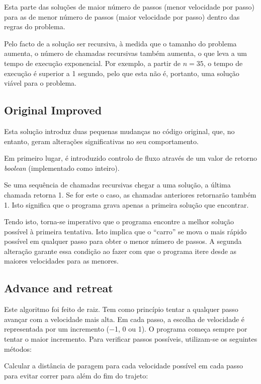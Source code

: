 \documentclass[portuguese,11pt,a4paper,titlepage]{article}
\newcommand{\extrang}[1]{\textit{#1}}
\newcommand{\srcdir}{..}
\begin{document}
Esta parte das soluções de maior número de passos (menor velocidade por passo) para
as de menor número de passos (maior velocidade por passo) dentro das regras do problema.

Pelo facto de a solução ser recursiva, à medida que o tamanho do problema aumenta,
o número de chamadas recursivas também aumenta, o que leva a um tempo de execução exponencial.
Por exemplo, a partir de \begin{math}n = 35\end{math}, o tempo de execução é superior a 1 segundo,
pelo que esta não é, portanto, uma solução viável para o problema. 

\subsection{Original Improved}
Esta solução introduz duas pequenas mudanças no código original, que, no entanto,
geram alterações significativas no seu comportamento.

Em primeiro lugar, é introduzido controlo de fluxo através de um valor de retorno
\extrang{boolean} (implementado como inteiro).

Se uma sequência de chamadas recursivas chegar a uma solução, a última chamada
retorna 1. 
Se for este o caso, as chamadas anteriores retornarão também 1.
Isto significa que o programa grava apenas a primeira solução que encontrar.

Tendo isto, torna-se imperativo que o programa encontre a melhor solução possível
à primeira tentativa. Isto implica que o ``carro'' se mova o mais rápido possível
em qualquer passo para obter o menor número de passos. A segunda alteração
garante essa condição ao fazer com que o programa itere
desde as maiores velocidades para as menores.


\subsection{Advance and retreat}
Este algoritmo foi feito de raiz. Tem como
princípio tentar a qualquer passo avançar com a velocidade mais alta.
Em cada passo, a escolha de velocidade é representada por um incremento
($-$1, 0 ou 1). O programa começa sempre por tentar o maior incremento.
Para verificar passos possíveis, utilizam-se os seguintes métodos:

Calcular a distância de paragem para cada velocidade possível em cada passo para evitar correr para além do fim do
trajeto:

\end{document}
